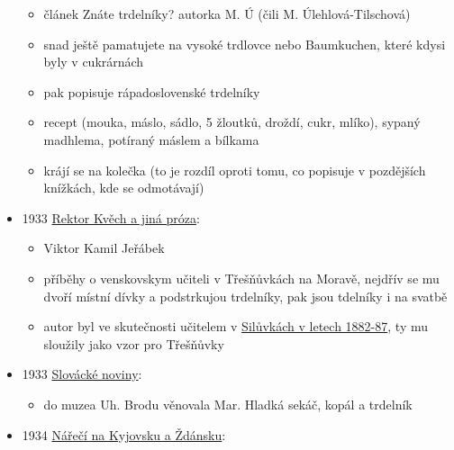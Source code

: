 \begin{itemize}
  \begin{itemize}
  \tightlist
  \item
    článek Znáte trdelníky? autorka M. Ú (čili M. Úlehlová-Tilschová)
  \item
    snad ještě pamatujete na vysoké trdlovce nebo Baumkuchen, které
    kdysi byly v cukrárnách
  \item
    pak popisuje rápadoslovenské trdelníky
  \item
    recept (mouka, máslo, sádlo, 5 žloutků, droždí, cukr, mlíko), sypaný
    madhlema, potíraný máslem a bílkama
  \item
    krájí se na kolečka (to je rozdíl oproti tomu, co popisuje v
    pozdějších knížkách, kde se odmotávají)
  \end{itemize}
\item
  1933
  \href{https://ceskadigitalniknihovna.cz/view/uuid:60eab9a0-0be7-11ed-8635-005056827e52?page=uuid\%3A8ee6bb86-db3e-4211-a60a-d927a201dc69&fulltext=trdeln*&source=mzk}{Rektor
  Kvěch a jiná próza}:

  \begin{itemize}
  \tightlist
  \item
    Viktor Kamil Jeřábek
  \item
    příběhy o venskovskym učiteli v Třešňůvkách na Moravě, nejdřív se mu
    dvoří místní dívky a podstrkujou trdelníky, pak jsou tdelníky i na
    svatbě
  \item
    autor byl ve skutečnosti učitelem v
    \href{https://kramerius.lib.cas.cz/view/uuid:48220bc0-4294-11e2-b246-005056827e52?page=uuid\%3A04efbdca-01ec-4111-8df2-32a5f52f4c16}{Silůvkách
    v letech 1882-87}, ty mu sloužily jako vzor pro Třešňůvky
  \end{itemize}
\item
  1933
  \href{https://www.digitalniknihovna.cz/vkol/uuid/uuid:349c38c2-fadc-4992-a172-9aacc818e434}{Slovácké
  noviny}:

  \begin{itemize}
  \tightlist
  \item
    do muzea Uh. Brodu věnovala Mar. Hladká sekáč, kopál a trdelník
  \end{itemize}
\item
  1934
  \href{https://ceskadigitalniknihovna.cz/view/uuid:e1259815-3caf-4b6b-af1d-8ada80900484?page=uuid\%3A8bb1ba0a-525b-11e5-a788-0050569d679d&fulltext=trdeln\%C3\%ADk\%20OR\%20trdeln\%C3\%ADky\%20OR\%20trdeln\%C3\%ADk\%C5\%AF&source=mzk}{Nářečí
  na Kyjovsku a Ždánsku}:


\end{itemize}
